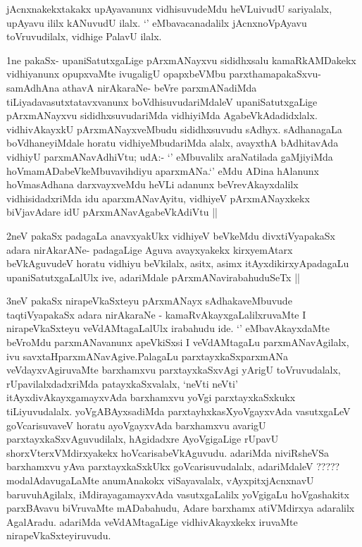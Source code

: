 \begin{artha}
jAcnxnakekxtakakx upAyavanunx vidhisuvudeMdu heVLuivudU sariyalalx,
upAyavu ililx kANuvudU ilalx. `\stext' eMbavacanadalilx jAcnxnoVpAyavu
toVruvudilalx, vidhige PalavU ilalx.
\end{artha}

\begin{center}


\end{center}


\begin{artha}
1ne pakaSx- upaniSatutxgaLige pArxmANayxvu sididhxsalu kamaRkAMDakekx
vidhiyanunx opupxvaMte ivugaligU opapxbeVMbu parxthamapakaSxvu-
samAdhAna athavA nirAkaraNe- beVre parxmANadiMda
tiLiyadavasutxtatavxvanunx boVdhisuvudariMdaleV upaniSatutxgaLige
pArxmANayxvu sididhxsuvudariMda vidhiyiMda
AgabeVkAdadidxlalx. vidhivAkayxkU pArxmANayxveMbudu sididhxsuvudu
sAdhyx. sAdhanagaLa boVdhaneyiMdale horatu vidhiyeMbudariMda alalx,
avayxthA bAdhitavAda vidhiyU parxmANavAdhiVtu; udA:- `\stext'
eMbuvalilx araNatilada gaMjiyiMda hoVmamADabeVkeMbuvavihdiyu
aparxmANa.`\stext' eMdu ADina hAlanunx hoVmasAdhana darxvayxveMdu
heVLi adanunx beVrevAkayxdalilx vidhisidadxriMda idu aparxmANavAyitu,
vidhiyeV pArxmANayxkekx biVjavAdare idU pArxmANavAgabeVkAdiVtu ||
\end{artha}

\begin{artha}
2neV pakaSx padagaLa anavxyakUkx vidhiyeV beVkeMdu divxtiVyapakaSx
adara nirAkarANe- padagaLige Aguva avayxyakekx kirxyemAtarx
beVkAguvudeV horatu vidhiyu beVkilalx, asitx, asimx
itAyxdikirxyApadagaLu upaniSatutxgaLalUlx ive, adariMdale
pArxmANavirabahuduSeTx ||
\end{artha}

\begin{artha}
3neV pakaSx nirapeVkaSxteyu pArxmANayx sAdhakaveMbuvude taqtiVyapakaSx
adara nirAkaraNe - kamaRvAkayxgaLalilxruvaMte I nirapeVkaSxteyu
veVdAMtagaLalUlx irabahudu ide. `\stext' eMbavAkayxdaMte beVroMdu
parxmANavanunx apeVkiSxsi I veVdAMtagaLu parxmANavAgilalx, ivu
savxtaHparxmANavAgive.PalagaLu parxtayxkaSxparxmANa veVdayxvAgiruvaMte
barxhamxvu parxtayxkaSxvAgi yArigU toVruvudalalx, rUpavilalxdadxriMda
patayxkaSxvalalx, `neVti neVti' itAyxdivAkayxgamayxvAda barxhamxvu
yoVgi parxtayxkaSxkukx tiLiyuvudalalx. yoVgABAyxsadiMda
parxtayhxkasXyoVgayxvAda vasutxgaLeV goVcarisuvaveV horatu
ayoVgayxvAda barxhamxvu avarigU parxtayxkaSxvAguvudilalx, hAgidadxre
AyoVgigaLige rUpavU shorxVterxVMdirxyakekx
hoVcarisabeVkAguvudu. adariMda niviRsheVSa barxhamxvu yAva
parxtayxkaSxkUkx goVcarisuvudalalx, adariMdaleV ?????
modalAdavugaLaMte anumAnakokx viSayavalalx, vAyxpitxjAcnxnavU
baruvuhAgilalx, iMdirayagamayxvAda vasutxgaLalilx yoVgigaLu
hoVgashakitx parxBAvavu biVruvaMte mADabahudu, Adare barxhamx
atiVMdirxya adaralilx AgalAradu. adariMda veVdAMtagaLige
vidhivAkayxkekx iruvaMte nirapeVkaSxteyiruvudu.
\end{artha}

